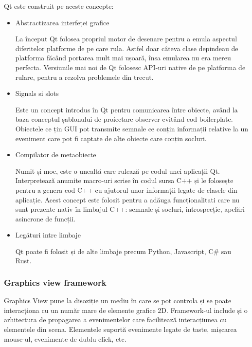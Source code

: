 Qt este construit pe aceste concepte:
\begin{itemize}
    \item Abstractizarea interfeței grafice
    
    La început Qt folosea propriul motor de desenare pentru a emula aspectul diferitelor platforme de pe care rula. 
    Astfel doar câteva clase depindeau de platforma făcând portarea mult mai ușoară, însa emularea nu era mereu perfecta. 
    Versiunile mai noi de Qt folosesc API-uri native de pe platforma de rulare, pentru a rezolva problemele din trecut.

    \item Signals si slots
    
    Este un concept introdus în Qt pentru comunicarea între obiecte, având la baza conceptul șablonului de proiectare observer 
    evitând cod boilerplate. Obiectele ce țin GUI pot transmite semnale ce conțin informații relative la un eveniment care pot 
    fi captate de alte obiecte care conțin socluri.

    \item Compilator de metaobiecte

    Numit și moc, este o unealtă care rulează pe codul unei aplicații Qt. Interpretează anumite macro-uri scrise în codul 
    sursa C++ și le folosește pentru a genera cod C++ cu ajutorul unor informații legate de clasele din aplicație. 
    Acest concept este folosit pentru a adăuga funcționalitati care nu sunt prezente nativ în limbajul C++: semnale și socluri, 
    introspecție, apelări asincrone de funcții.

    \item Legături intre limbaje

    Qt poate fi folosit și de alte limbaje precum Python, Javascript, C\# sau Rust.
\end{itemize}

\subsubsection{Graphics view framework}

Graphics View pune la disoziție un mediu în care se pot controla și se poate interacționa cu un număr mare de elemente grafice 2D. 
Framework-ul include și o arhitectura de propagarea a evenimentelor care facilitează interacțiunea cu elementele din scena. 
Elementele suportă evenimente legate de taste, mișcarea mouse-ul, evenimente de dublu click, etc. \newline


